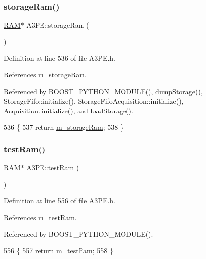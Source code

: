 \subsubsection{\texorpdfstring{storage\+Ram()}{storageRam()}}
{\footnotesize\ttfamily \hyperlink{classRAM}{R\+AM}$\ast$ A3\+P\+E\+::storage\+Ram (\begin{DoxyParamCaption}{ }\end{DoxyParamCaption})\hspace{0.3cm}{\ttfamily [inline]}}



Definition at line 536 of file A3\+P\+E.\+h.



References m\+\_\+storage\+Ram.



Referenced by B\+O\+O\+S\+T\+\_\+\+P\+Y\+T\+H\+O\+N\+\_\+\+M\+O\+D\+U\+L\+E(), dump\+Storage(), Storage\+Fifo\+::initialize(), Storage\+Fifo\+Acquisition\+::initialize(), Acquisition\+::initialize(), and load\+Storage().


\begin{DoxyCode}
536                    \{
537     \textcolor{keywordflow}{return} \hyperlink{classA3PE_a41e317474e0c6e63bad4648903279be9}{m\_storageRam};
538   \}
\end{DoxyCode}
\mbox{\label{classA3PE_a9327d0bd2efb5baa7c6b7de27bbc5997}} 
\subsubsection{\texorpdfstring{test\+Ram()}{testRam()}}
{\footnotesize\ttfamily \hyperlink{classRAM}{R\+AM}$\ast$ A3\+P\+E\+::test\+Ram (\begin{DoxyParamCaption}{ }\end{DoxyParamCaption})\hspace{0.3cm}{\ttfamily [inline]}}



Definition at line 556 of file A3\+P\+E.\+h.



References m\+\_\+test\+Ram.



Referenced by B\+O\+O\+S\+T\+\_\+\+P\+Y\+T\+H\+O\+N\+\_\+\+M\+O\+D\+U\+L\+E().


\begin{DoxyCode}
556                 \{
557     \textcolor{keywordflow}{return} \hyperlink{classA3PE_ad788e41ef5c674ab1a7671f3db0ffef6}{m\_testRam};
558   \}
\end{DoxyCode}
\mbox{\label{classObject_a73a0f1a41828fdd8303dd662446fb6c3}} 
